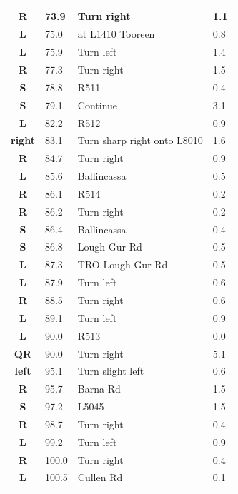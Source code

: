 \documentclass[11pt]{article}
\begin{document}
\begin{center}
\begin{supertabular}{|c|p{0.30in}|p{2.25in}|l|}
 \textbf{R} &  73.9 & Turn right &   1.1 \\ \hline
 \textbf{L} &  75.0 & at L1410 Tooreen &   0.8 \\ \hline
 \textbf{L} &  75.9 & Turn left &   1.4 \\ \hline
{} \textbf{R} &  77.3 & Turn right &   1.5 \\ \hline
 \textbf{S} &  78.8 & R511 &   0.4 \\ \hline
 \textbf{S} &  79.1 & Continue &   3.1 \\ \hline
 \textbf{L} &  82.2 & R512 &   0.9 \\ \hline
 \textbf{right} &  83.1 & Turn sharp right onto L8010 &   1.6 \\ \hline
{} \textbf{R} &  84.7 & Turn right &   0.9 \\ \hline
 \textbf{L} &  85.6 & Ballincassa &   0.5 \\ \hline
{} \textbf{R} &  86.1 & R514 &   0.2 \\ \hline
{} \textbf{R} &  86.2 & Turn right &   0.2 \\ \hline
 \textbf{S} &  86.4 & Ballincassa &   0.4 \\ \hline
 \textbf{S} &  86.8 & Lough Gur Rd &   0.5 \\ \hline
 \textbf{L} &  87.3 & TRO Lough Gur Rd &   0.5 \\ \hline
 \textbf{L} &  87.9 & Turn left &   0.6 \\ \hline
{} \textbf{R} &  88.5 & Turn right &   0.6 \\ \hline
 \textbf{L} &  89.1 & Turn left &   0.9 \\ \hline
 \textbf{L} &  90.0 & R513 &   0.0 \\ \hline
{} \textbf{QR} &  90.0 & Turn right &   5.1 \\ \hline
 \textbf{left} &  95.1 & Turn slight left &   0.6 \\ \hline
{} \textbf{R} &  95.7 & Barna Rd &   1.5 \\ \hline
 \textbf{S} &  97.2 & L5045 &   1.5 \\ \hline
{} \textbf{R} &  98.7 & Turn right &   0.4 \\ \hline
 \textbf{L} &  99.2 & Turn left &   0.9 \\ \hline
{} \textbf{R} & 100.0 & Turn right &   0.4 \\ \hline
 \textbf{L} & 100.5 & Cullen Rd &   0.1 \\ \hline

\end{supertabular}
\end{center}
\end{document}
